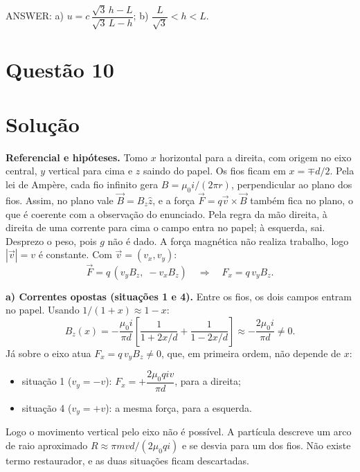\documentclass{article}%
\begin{document}
ANSWER: a) $u=c\,\dfrac{\sqrt3\,h-L}{\sqrt3\,L-h}$; b) $\dfrac{L}{\sqrt3}<h<L$.%
\newpage%
\section*{Questão 10}

\section*{Solução}

\textbf{Referencial e hipóteses.} Tomo $x$ horizontal para a direita, com origem no eixo central, $y$ vertical para cima e $z$ saindo do papel. Os fios ficam em $x=\mp d/2$. Pela lei de Ampère, cada fio infinito gera $B=\mu_0 i/(2\pi r)$, perpendicular ao plano dos fios. Assim, no plano vale $\vec B=B_z\hat z$, e a força $\vec F=q\vec v\times\vec B$ também fica no plano, o que é coerente com a observação do enunciado. Pela regra da mão direita, à direita de uma corrente para cima o campo entra no papel; à esquerda, sai. Desprezo o peso, pois $g$ não é dado. A força magnética não realiza trabalho, logo $|\vec v|=v$ é constante. Com $\vec v=(v_x,v_y)$:
\[
\vec F=q\,(v_y B_z,\;-v_x B_z)\quad\Rightarrow\quad F_x=q\,v_yB_z .
\]

\textbf{a) Correntes opostas (situações 1 e 4).} Entre os fios, os dois campos entram no papel. Usando $1/(1+x)\approx 1-x$:
\[
B_z(x)=-\frac{\mu_0 i}{\pi d}\left[\frac{1}{1+2x/d}+\frac{1}{1-2x/d}\right]\approx-\frac{2\mu_0 i}{\pi d}\neq 0 .
\]
Já sobre o eixo atua $F_x=q\,v_yB_z\neq0$, que, em primeira ordem, não depende de $x$:
\begin{itemize}
\item situação 1 ($v_y=-v$): $F_x=+\dfrac{2\mu_0 q i v}{\pi d}$, para a direita;
\item situação 4 ($v_y=+v$): a mesma força, para a esquerda.
\end{itemize}
Logo o movimento vertical pelo eixo não é possível. A partícula descreve um arco de raio aproximado $R\approx \pi m v d/(2\mu_0 q i)$ e se desvia para um dos fios. Não existe termo restaurador, e as duas situações ficam descartadas.
\end{document}
